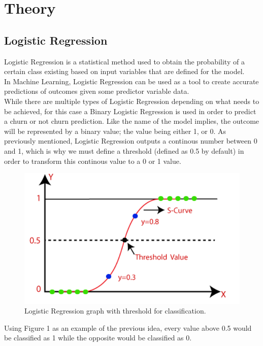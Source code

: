 \documentclass[letterpaper, 10 pt, conference]{ieeeconf}
\begin{document}
\section{ Theory }
\subsection{Logistic Regression}
Logistic Regression is a statistical method used to obtain the probability of a certain class existing based
on input variables that are defined for the model. \\

In Machine Learning, Logistic Regression can be used as a tool to create accurate predictions of outcomes given some predictor variable data. \\

While there are multiple types of Logistic Regression depending on what needs to be achieved, for this case a Binary Logistic Regression is used in order
to predict a churn or not churn prediction. Like the name of the model implies, the outcome will be represented by a binary value; the value being either 1, or 0.
As previously mentioned, Logistic Regression outputs a continous number between 0 and 1, which is why we must define a threshold (defined as 0.5 by default) in order to 
transform this continous value to a 0 or 1 value.
\\


\begin{figure}[thpb]
    \centering
    \includegraphics[scale=0.3]{figures/threshold.png}
    \caption{Logistic Regression graph with threshold for classification.}
    \label{logisticThreshold}
 \end{figure}

Using Figure 1 as an example of the previous idea, every value above 0.5 would be classified as 1 while the opposite would be classified as 0. \\
\end{document}
